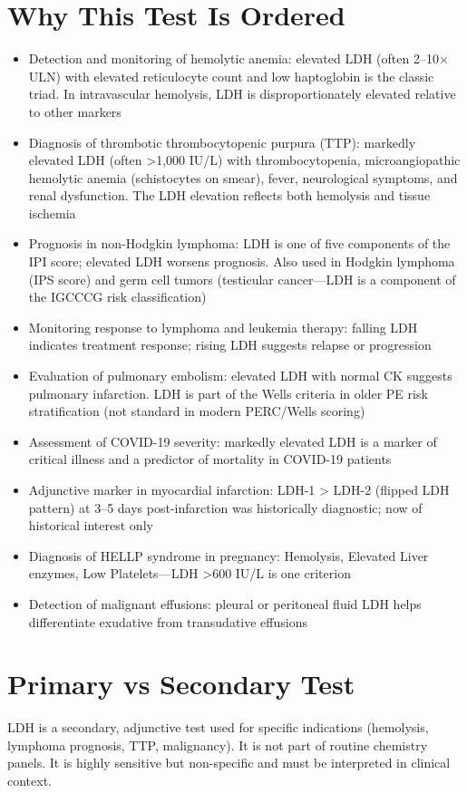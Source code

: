\section*{Why This Test Is Ordered}
\begin{itemize}
  \item Detection and monitoring of hemolytic anemia: elevated LDH (often 2--10$\times$ ULN) with elevated reticulocyte count and low haptoglobin is the classic triad. In intravascular hemolysis, LDH is disproportionately elevated relative to other markers \cite{barcellini2015clinical}
  \item Diagnosis of thrombotic thrombocytopenic purpura (TTP): markedly elevated LDH (often >1,000 IU/L) with thrombocytopenia, microangiopathic hemolytic anemia (schistocytes on smear), fever, neurological symptoms, and renal dysfunction. The LDH elevation reflects both hemolysis and tissue ischemia
  \item Prognosis in non-Hodgkin lymphoma: LDH is one of five components of the IPI score; elevated LDH worsens prognosis. Also used in Hodgkin lymphoma (IPS score) and germ cell tumors (testicular cancer---LDH is a component of the IGCCCG risk classification)
  \item Monitoring response to lymphoma and leukemia therapy: falling LDH indicates treatment response; rising LDH suggests relapse or progression
  \item Evaluation of pulmonary embolism: elevated LDH with normal CK suggests pulmonary infarction. LDH is part of the Wells criteria in older PE risk stratification (not standard in modern PERC/Wells scoring)
  \item Assessment of COVID-19 severity: markedly elevated LDH is a marker of critical illness and a predictor of mortality in COVID-19 patients
  \item Adjunctive marker in myocardial infarction: LDH-1 > LDH-2 (flipped LDH pattern) at 3--5 days post-infarction was historically diagnostic; now of historical interest only
  \item Diagnosis of HELLP syndrome in pregnancy: Hemolysis, Elevated Liver enzymes, Low Platelets---LDH >600 IU/L is one criterion
  \item Detection of malignant effusions: pleural or peritoneal fluid LDH helps differentiate exudative from transudative effusions
\end{itemize}

\section*{Primary vs Secondary Test}
LDH is a secondary, adjunctive test used for specific indications (hemolysis, lymphoma prognosis, TTP, malignancy). It is not part of routine chemistry panels. It is highly sensitive but non-specific and must be interpreted in clinical context.

